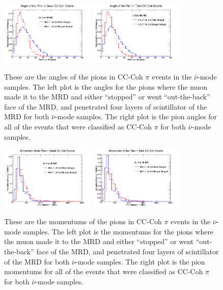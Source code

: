 \documentclass[11pt]{article}
\begin{document}
\begin{figure}[H]
\centering
\includegraphics[width=0.4\textwidth]{ANMPionPlottingImages/7-ANMPionPlotting.png}
\includegraphics[width=0.4\textwidth]{ANMPionPlottingImages/10-ANMPionPlotting.png}
\caption{These are the angles of the pions in CC-Coh $\pi$ events in the $\bar{\nu}$-mode samples. The left plot is the angles for the pions where the muon made it to the MRD and either ``stopped'' or went ``out-the-back'' face of the MRD, and penetrated four layers of scintillator of the MRD for both $\bar{\nu}$-mode samples. The right plot is the pion angles for all of the events that were classified as CC-Coh $\pi$ for both $\bar{\nu}$-mode samples.}
\label{fig:app:ANMPionAng}
\end{figure}

\begin{figure}[H]
\centering
\includegraphics[width=0.4\textwidth]{ANMPionPlottingImages/8-ANMPionPlotting.png}
\includegraphics[width=0.4\textwidth]{ANMPionPlottingImages/11-ANMPionPlotting.png}
\caption{These are the momentums of the pions in CC-Coh $\pi$ events in the $\bar{\nu}$-mode samples. The left plot is the momentums for the pions where the muon made it to the MRD and either ``stopped'' or went ``out-the-back'' face of the MRD, and penetrated four layers of scintillator of the MRD for both $\bar{\nu}$-mode samples. The right plot is the pion momentums for all of the events that were classified as CC-Coh $\pi$ for both $\bar{\nu}$-mode samples.}
\label{fig:app:ANMPionMom}
\end{figure}
\end{document}
